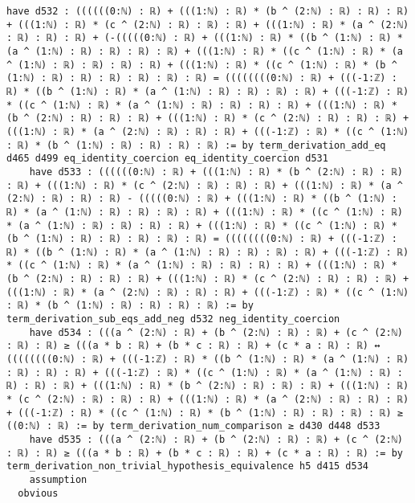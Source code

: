 \documentclass{article}
\begin{document}
\begin{tcolorbox}[colback=white!10, width=\linewidth]
\begin{lstlisting}[language=Lean4]
    have d532 : ((((((0:ℕ) : ℝ) + (((1:ℕ) : ℝ) * (b ^ (2:ℕ) : ℝ) : ℝ) : ℝ) + (((1:ℕ) : ℝ) * (c ^ (2:ℕ) : ℝ) : ℝ) : ℝ) + (((1:ℕ) : ℝ) * (a ^ (2:ℕ) : ℝ) : ℝ) : ℝ) + (-(((((0:ℕ) : ℝ) + (((1:ℕ) : ℝ) * ((b ^ (1:ℕ) : ℝ) * (a ^ (1:ℕ) : ℝ) : ℝ) : ℝ) : ℝ) + (((1:ℕ) : ℝ) * ((c ^ (1:ℕ) : ℝ) * (a ^ (1:ℕ) : ℝ) : ℝ) : ℝ) : ℝ) + (((1:ℕ) : ℝ) * ((c ^ (1:ℕ) : ℝ) * (b ^ (1:ℕ) : ℝ) : ℝ) : ℝ) : ℝ) : ℝ) : ℝ) = ((((((((0:ℕ) : ℝ) + (((-1:ℤ) : ℝ) * ((b ^ (1:ℕ) : ℝ) * (a ^ (1:ℕ) : ℝ) : ℝ) : ℝ) : ℝ) + (((-1:ℤ) : ℝ) * ((c ^ (1:ℕ) : ℝ) * (a ^ (1:ℕ) : ℝ) : ℝ) : ℝ) : ℝ) + (((1:ℕ) : ℝ) * (b ^ (2:ℕ) : ℝ) : ℝ) : ℝ) + (((1:ℕ) : ℝ) * (c ^ (2:ℕ) : ℝ) : ℝ) : ℝ) + (((1:ℕ) : ℝ) * (a ^ (2:ℕ) : ℝ) : ℝ) : ℝ) + (((-1:ℤ) : ℝ) * ((c ^ (1:ℕ) : ℝ) * (b ^ (1:ℕ) : ℝ) : ℝ) : ℝ) : ℝ) := by term_derivation_add_eq d465 d499 eq_identity_coercion eq_identity_coercion d531
    have d533 : ((((((0:ℕ) : ℝ) + (((1:ℕ) : ℝ) * (b ^ (2:ℕ) : ℝ) : ℝ) : ℝ) + (((1:ℕ) : ℝ) * (c ^ (2:ℕ) : ℝ) : ℝ) : ℝ) + (((1:ℕ) : ℝ) * (a ^ (2:ℕ) : ℝ) : ℝ) : ℝ) - (((((0:ℕ) : ℝ) + (((1:ℕ) : ℝ) * ((b ^ (1:ℕ) : ℝ) * (a ^ (1:ℕ) : ℝ) : ℝ) : ℝ) : ℝ) + (((1:ℕ) : ℝ) * ((c ^ (1:ℕ) : ℝ) * (a ^ (1:ℕ) : ℝ) : ℝ) : ℝ) : ℝ) + (((1:ℕ) : ℝ) * ((c ^ (1:ℕ) : ℝ) * (b ^ (1:ℕ) : ℝ) : ℝ) : ℝ) : ℝ) : ℝ) = ((((((((0:ℕ) : ℝ) + (((-1:ℤ) : ℝ) * ((b ^ (1:ℕ) : ℝ) * (a ^ (1:ℕ) : ℝ) : ℝ) : ℝ) : ℝ) + (((-1:ℤ) : ℝ) * ((c ^ (1:ℕ) : ℝ) * (a ^ (1:ℕ) : ℝ) : ℝ) : ℝ) : ℝ) + (((1:ℕ) : ℝ) * (b ^ (2:ℕ) : ℝ) : ℝ) : ℝ) + (((1:ℕ) : ℝ) * (c ^ (2:ℕ) : ℝ) : ℝ) : ℝ) + (((1:ℕ) : ℝ) * (a ^ (2:ℕ) : ℝ) : ℝ) : ℝ) + (((-1:ℤ) : ℝ) * ((c ^ (1:ℕ) : ℝ) * (b ^ (1:ℕ) : ℝ) : ℝ) : ℝ) : ℝ) := by term_derivation_sub_eqs_add_neg d532 neg_identity_coercion
    have d534 : (((a ^ (2:ℕ) : ℝ) + (b ^ (2:ℕ) : ℝ) : ℝ) + (c ^ (2:ℕ) : ℝ) : ℝ) ≥ (((a * b : ℝ) + (b * c : ℝ) : ℝ) + (c * a : ℝ) : ℝ) ↔ ((((((((0:ℕ) : ℝ) + (((-1:ℤ) : ℝ) * ((b ^ (1:ℕ) : ℝ) * (a ^ (1:ℕ) : ℝ) : ℝ) : ℝ) : ℝ) + (((-1:ℤ) : ℝ) * ((c ^ (1:ℕ) : ℝ) * (a ^ (1:ℕ) : ℝ) : ℝ) : ℝ) : ℝ) + (((1:ℕ) : ℝ) * (b ^ (2:ℕ) : ℝ) : ℝ) : ℝ) + (((1:ℕ) : ℝ) * (c ^ (2:ℕ) : ℝ) : ℝ) : ℝ) + (((1:ℕ) : ℝ) * (a ^ (2:ℕ) : ℝ) : ℝ) : ℝ) + (((-1:ℤ) : ℝ) * ((c ^ (1:ℕ) : ℝ) * (b ^ (1:ℕ) : ℝ) : ℝ) : ℝ) : ℝ) ≥ ((0:ℕ) : ℝ) := by term_derivation_num_comparison ≥ d430 d448 d533
    have d535 : (((a ^ (2:ℕ) : ℝ) + (b ^ (2:ℕ) : ℝ) : ℝ) + (c ^ (2:ℕ) : ℝ) : ℝ) ≥ (((a * b : ℝ) + (b * c : ℝ) : ℝ) + (c * a : ℝ) : ℝ) := by term_derivation_non_trivial_hypothesis_equivalence h5 d415 d534
    assumption
  obvious

\end{lstlisting}
\end{tcolorbox}
\end{document}
